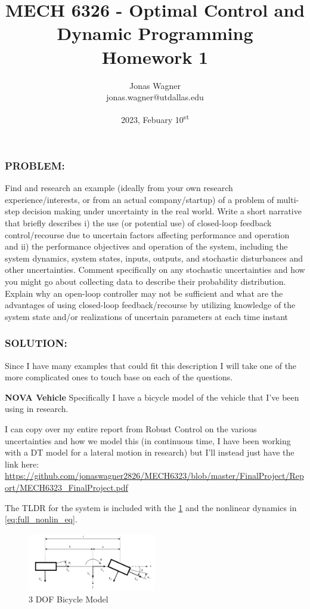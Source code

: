 \documentclass[]{article}
\title{
    MECH 6326 - Optimal Control and Dynamic Programming \\ 
    Homework 1
}
\author{Jonas Wagner\\ jonas.wagner@utdallas.edu}
\date{2023, Febuary 10\textsuperscript{st}}
\newcommand{\Problem}{\subsubsection*{\textbf{PROBLEM:}}}
\newcommand{\Solution}{\subsubsection*{\textbf{SOLUTION:}}}
\begin{document}
\maketitle

\tableofcontents

\newpage
\section{}
\Problem
Find and research an example (ideally from your own research experience/interests, or from an actual company/startup) of a problem of multi-step decision making under uncertainty in the real world. 
Write a short narrative that briefly describes 
i) the use (or potential use) of closed-loop feedback control/recourse due to uncertain factors affecting performance and operation and 
ii) the performance objectives and operation of the system, including the system dynamics, system states, inputs, outputs, and stochastic disturbances and other uncertainties. 
Comment specifically on any stochastic uncertainties and how you might go about collecting data to describe their probability distribution. 
Explain why an open-loop controller may not be sufficient and what are the advantages of using closed-loop feedback/recourse by utilizing knowledge of the system state and/or realizations of uncertain parameters at each time instant

\Solution
Since I have many examples that could fit this description I will take one of the more complicated ones to touch base on each of the questions.

\textbf{NOVA Vehicle} \cite{mech6323FinalProject}
Specifically I have a bicycle model of the vehicle that I've been using in research.

I can copy over my entire report from Robust Control on the various uncertainties and how we model this (in continuous time, I have been working with a DT model for a lateral motion in research) but I'll instead just have the link here:
\url{https://github.com/jonaswagner2826/MECH6323/blob/master/FinalProject/Report/MECH6323_FinalProject.pdf}

The TLDR for the system is included with the \figurename \ref{fig:3dof_bike_model} and the nonlinear dynamics in \eqref{eq:full_nonlin_eq}.

\begin{figure}[b]
    \centering
    \includegraphics[width=0.5\textwidth]{figs/3dof_model_diag.png}
    \caption{3 DOF Bicycle Model}
    \label{fig:3dof_bike_model}
\end{figure}
\end{document}
